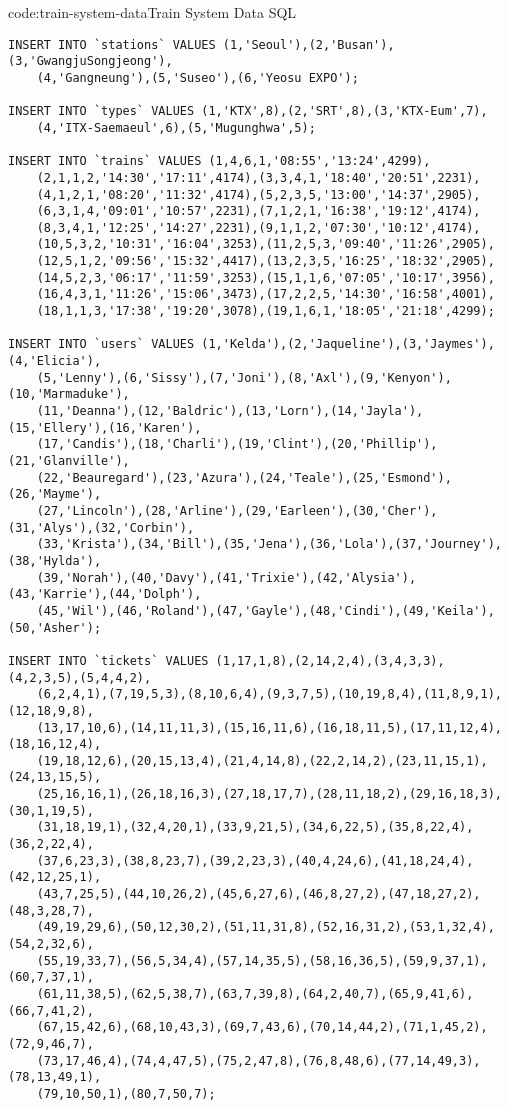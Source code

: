 \begin{codeenv}{code:train-system-data}{Train System Data SQL}
\begin{verbatim}
INSERT INTO `stations` VALUES (1,'Seoul'),(2,'Busan'),(3,'GwangjuSongjeong'),
    (4,'Gangneung'),(5,'Suseo'),(6,'Yeosu EXPO');

INSERT INTO `types` VALUES (1,'KTX',8),(2,'SRT',8),(3,'KTX-Eum',7),
    (4,'ITX-Saemaeul',6),(5,'Mugunghwa',5);

INSERT INTO `trains` VALUES (1,4,6,1,'08:55','13:24',4299),
    (2,1,1,2,'14:30','17:11',4174),(3,3,4,1,'18:40','20:51',2231),
    (4,1,2,1,'08:20','11:32',4174),(5,2,3,5,'13:00','14:37',2905),
    (6,3,1,4,'09:01','10:57',2231),(7,1,2,1,'16:38','19:12',4174),
    (8,3,4,1,'12:25','14:27',2231),(9,1,1,2,'07:30','10:12',4174),
    (10,5,3,2,'10:31','16:04',3253),(11,2,5,3,'09:40','11:26',2905),
    (12,5,1,2,'09:56','15:32',4417),(13,2,3,5,'16:25','18:32',2905),
    (14,5,2,3,'06:17','11:59',3253),(15,1,1,6,'07:05','10:17',3956),
    (16,4,3,1,'11:26','15:06',3473),(17,2,2,5,'14:30','16:58',4001),
    (18,1,1,3,'17:38','19:20',3078),(19,1,6,1,'18:05','21:18',4299);

INSERT INTO `users` VALUES (1,'Kelda'),(2,'Jaqueline'),(3,'Jaymes'),(4,'Elicia'),
    (5,'Lenny'),(6,'Sissy'),(7,'Joni'),(8,'Axl'),(9,'Kenyon'),(10,'Marmaduke'),
    (11,'Deanna'),(12,'Baldric'),(13,'Lorn'),(14,'Jayla'),(15,'Ellery'),(16,'Karen'),
    (17,'Candis'),(18,'Charli'),(19,'Clint'),(20,'Phillip'),(21,'Glanville'),
    (22,'Beauregard'),(23,'Azura'),(24,'Teale'),(25,'Esmond'),(26,'Mayme'),
    (27,'Lincoln'),(28,'Arline'),(29,'Earleen'),(30,'Cher'),(31,'Alys'),(32,'Corbin'),
    (33,'Krista'),(34,'Bill'),(35,'Jena'),(36,'Lola'),(37,'Journey'),(38,'Hylda'),
    (39,'Norah'),(40,'Davy'),(41,'Trixie'),(42,'Alysia'),(43,'Karrie'),(44,'Dolph'),
    (45,'Wil'),(46,'Roland'),(47,'Gayle'),(48,'Cindi'),(49,'Keila'),(50,'Asher');

INSERT INTO `tickets` VALUES (1,17,1,8),(2,14,2,4),(3,4,3,3),(4,2,3,5),(5,4,4,2),
    (6,2,4,1),(7,19,5,3),(8,10,6,4),(9,3,7,5),(10,19,8,4),(11,8,9,1),(12,18,9,8),
    (13,17,10,6),(14,11,11,3),(15,16,11,6),(16,18,11,5),(17,11,12,4),(18,16,12,4),
    (19,18,12,6),(20,15,13,4),(21,4,14,8),(22,2,14,2),(23,11,15,1),(24,13,15,5),
    (25,16,16,1),(26,18,16,3),(27,18,17,7),(28,11,18,2),(29,16,18,3),(30,1,19,5),
    (31,18,19,1),(32,4,20,1),(33,9,21,5),(34,6,22,5),(35,8,22,4),(36,2,22,4),
    (37,6,23,3),(38,8,23,7),(39,2,23,3),(40,4,24,6),(41,18,24,4),(42,12,25,1),
    (43,7,25,5),(44,10,26,2),(45,6,27,6),(46,8,27,2),(47,18,27,2),(48,3,28,7),
    (49,19,29,6),(50,12,30,2),(51,11,31,8),(52,16,31,2),(53,1,32,4),(54,2,32,6),
    (55,19,33,7),(56,5,34,4),(57,14,35,5),(58,16,36,5),(59,9,37,1),(60,7,37,1),
    (61,11,38,5),(62,5,38,7),(63,7,39,8),(64,2,40,7),(65,9,41,6),(66,7,41,2),
    (67,15,42,6),(68,10,43,3),(69,7,43,6),(70,14,44,2),(71,1,45,2),(72,9,46,7),
    (73,17,46,4),(74,4,47,5),(75,2,47,8),(76,8,48,6),(77,14,49,3),(78,13,49,1),
    (79,10,50,1),(80,7,50,7);
\end{verbatim}
\end{codeenv}

